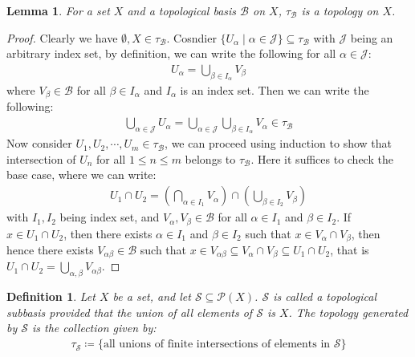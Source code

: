 \documentclass[11pt]{book}
\theoremstyle{break}
\theoremstyle{break}
\newtheorem{lem}{Lemma}[thm]
\newtheorem{defn}{Definition}[corL]
\newcommand{\Power}{\mathcal{P}}
\begin{document}
\begin{lem}
For a set $X$ and a topological basis $\mathcal{B}$ on $X$, $\tau_{\mathcal{B}}$ is a topology on $X$.
\end{lem}
\begin{proof}
Clearly we have $\emptyset, X \in \tau_\mathcal{B}$. Cosndier $\{U_\alpha \mid \alpha \in \mathcal{J}\}\subseteq \tau_{\mathcal{B}}$ with $\mathcal{J}$ being an arbitrary index set, by definition, we can write the following for all $\alpha \in \mathcal{J}$:
\begin{align*}
U_\alpha = \bigcup_{\beta \in I_\alpha} V_\beta
\end{align*}
where $V_{\beta} \in \mathcal{B}$ for all $\beta \in I_\alpha$ and $I_\alpha$ is an index set. Then we can write the following:
\begin{align*}
\bigcup_{\alpha \in \mathcal{J}}U_\alpha = \bigcup_{\alpha \in \mathcal{J}}\bigcup_{\beta \in I_{\alpha}}V_\alpha \in \tau_{\mathcal{B}}
\end{align*}
Now consider $U_1,U_2,\cdots, U_m \in \tau_\mathcal{B}$, we can proceed using induction to show that intersection of $U_n$ for all $1\leq n \leq m$ belongs to $\tau_{\mathcal{B}}$. Here it suffices to check the base case, where we can write:
\begin{align*}
U_1 \cap U_2 = \left( \bigcap_{\alpha \in I_1}V_\alpha\right) \cap \left( \bigcup_{\beta \in I_2}V_\beta\right)
\end{align*}
with $I_1,I_2$ being index set, and $V_\alpha,V_\beta \in \mathcal{B}$ for all $\alpha \in I_1$ and $\beta \in I_2$. If $x \in U_1 \cap U_2$, then there exists $\alpha \in I_1$ and $\beta \in I_2$ such that $x \in V_\alpha \cap V_\beta$, then hence there exists $V_{\alpha\beta} \in \mathcal{B}$ such that $x \in V_{\alpha\beta}\subseteq V_\alpha \cap V_{\beta} \subseteq U_1 \cap U_2$, that is $U_1 \cap U_2 = \bigcup_{\alpha,\beta} V_{\alpha\beta}$.
\end{proof}

\begin{defn}
Let $X$ be a set, and let $\mathcal{S} \subseteq \Power(X)$. $\mathcal{S}$ is called a topological subbasis provided that the union of all elements of $\mathcal{S}$ is $X$. The topology generated by $\mathcal{S}$ is the collection given by:
\begin{align*}
\tau_{\mathcal{S}}\coloneqq \{ \text{all unions of finite intersections of elements in }\mathcal{S}\}
\end{align*}
\end{defn}
\end{document}
